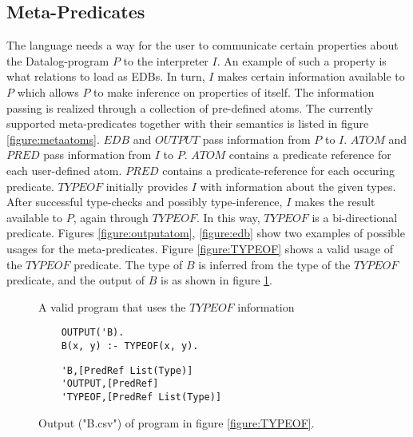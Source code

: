 \subsection{Meta-Predicates}
The language needs a way for the user to communicate certain properties about the Datalog-program $P$ to the interpreter $I$.
An example of such a property is what relations to load as EDBs.
In turn, $I$ makes certain information available to $P$ which allows $P$ to make inference on properties of itself.
The information passing is realized through a collection of pre-defined atoms. The currently supported meta-predicates together with their semantics is listed in figure \ref{figure:metaatoms}. $EDB$ and $OUTPUT$ pass information from $P$ to $I$. $ATOM$ and $PRED$ pass information from $I$ to $P$. $ATOM$ contains a predicate reference for each user-defined atom. $PRED$ contains a predicate-reference for each occuring predicate. $TYPEOF$ initially provides $I$ with information about the given types. After successful type-checks and possibly type-inference, $I$ makes the result available to $P$, again through $TYPEOF$. In this way, $TYPEOF$ is a bi-directional predicate. Figures \ref{figure:outputatom}, \ref{figure:edb} show two examples of possible usages for the meta-predicates. Figure \ref{figure:TYPEOF} shows a valid usage of the $TYPEOF$ predicate. The type of $B$ is inferred from the type of the $TYPEOF$ predicate, and the output of $B$ is as shown in figure \ref{figure:TYPEOFOUTPUT}.
\begin{figure}[!ht]
	\begin{minipage}[b]{.5\textwidth}
\caption{A valid program that uses the $TYPEOF$ information}
	\begin{verbatim}
	OUTPUT('B).
	B(x, y) :- TYPEOF(x, y).
	\end{verbatim}
	\label{figure:TYPEOF}
	\end{minipage}
\begin{minipage}[b]{.5\textwidth}
\caption{Output ("B.csv") of program in figure \ref{figure:TYPEOF}.}
	\begin{verbatim}
	'B,[PredRef List(Type)]
	'OUTPUT,[PredRef]
	'TYPEOF,[PredRef List(Type)]
	\end{verbatim}

\label{figure:TYPEOFOUTPUT}
\end{minipage}
\end{figure}

